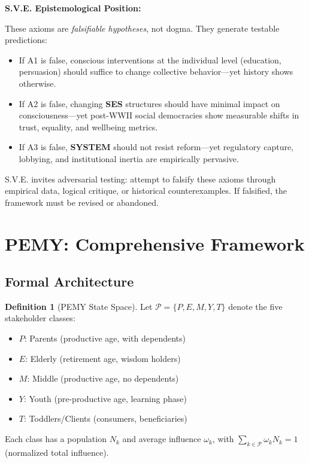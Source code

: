 \documentclass[11pt,a4paper]{article}
\newcommand{\SYSTEM}{\textbf{SYSTEM}}
\newcommand{\SES}{\textbf{SES}}
\theoremstyle{definition}
\newtheorem{definition}{Definition}[section]
\theoremstyle{remark}
\begin{document}
\begin{mdframed}[backgroundcolor=sveteal!5,linecolor=sveteal,linewidth=2pt]
\textbf{S.V.E. Epistemological Position:}

These axioms are \emph{falsifiable hypotheses}, not dogma. They generate testable predictions:
\begin{itemize}[leftmargin=1.5em]
\item If A1 is false, conscious interventions at the individual level (education, persuasion) should suffice to change collective behavior---yet history shows otherwise.
\item If A2 is false, changing \SES{} structures should have minimal impact on consciousness---yet post-WWII social democracies show measurable shifts in trust, equality, and wellbeing metrics.
\item If A3 is false, \SYSTEM{} should not resist reform---yet regulatory capture, lobbying, and institutional inertia are empirically pervasive.
\end{itemize}

S.V.E. invites adversarial testing: attempt to falsify these axioms through empirical data, logical critique, or historical counterexamples. If falsified, the framework must be revised or abandoned.
\end{mdframed}

\section{PEMY: Comprehensive Framework}
\label{app:pemy_comprehensive}

\subsection{Formal Architecture}
\label{app:pemy_formal}

\begin{definition}[PEMY State Space]
Let $\mathcal{P} = \{P, E, M, Y, T\}$ denote the five stakeholder classes:
\begin{itemize}[leftmargin=1.5em]
    \item $P$: Parents (productive age, with dependents)
    \item $E$: Elderly (retirement age, wisdom holders)
    \item $M$: Middle (productive age, no dependents)
    \item $Y$: Youth (pre-productive age, learning phase)
    \item $T$: Toddlers/Clients (consumers, beneficiaries)
\end{itemize}
Each class has a population $N_k$ and average influence $\omega_k$, with $\sum_{k \in \mathcal{P}} \omega_k N_k = 1$ (normalized total influence).
\end{definition}
\end{document}
